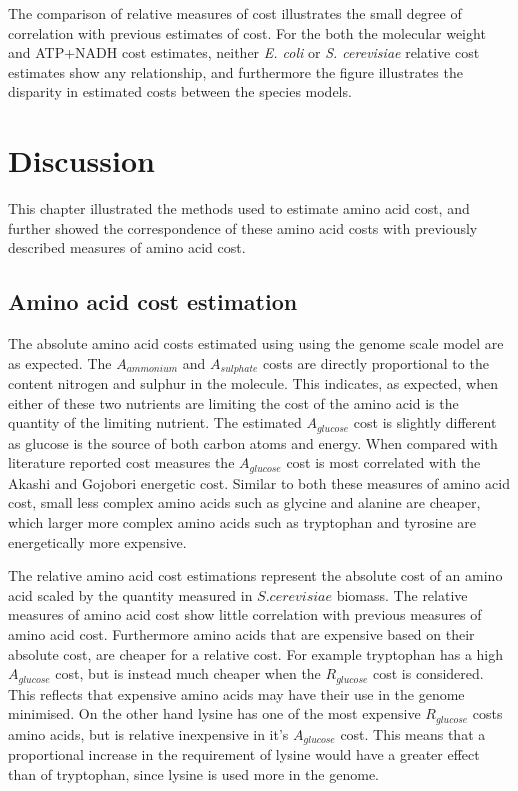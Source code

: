The comparison of relative measures of cost illustrates the small degree of correlation with previous estimates of cost. For the both the molecular weight and ATP+NADH cost estimates, neither \emph{E. coli} or \emph{S. cerevisiae} relative cost estimates show any relationship, and furthermore the figure illustrates the disparity in estimated costs between the species models.

\clearpage

\section{Discussion}

This chapter illustrated the methods used to estimate amino acid cost, and further showed the correspondence of these amino acid costs with previously described measures of amino acid cost.

\subsection{Amino acid cost estimation}

The absolute amino acid costs estimated using using the genome scale model are as expected. The $A_{ammonium}$ and $A_{sulphate}$ costs are directly proportional to the content nitrogen and sulphur in the molecule. This indicates, as expected, when either of these two nutrients are limiting the cost of the amino acid is the quantity of the limiting nutrient. The estimated $A_{glucose}$ cost is slightly different as glucose is the source of both carbon atoms and energy. When compared with literature reported cost measures the $A_{glucose}$ cost is most correlated with the Akashi and Gojobori energetic cost. Similar to both these measures of amino acid cost, small less complex amino acids such as glycine and alanine are cheaper, which larger more complex amino acids such as tryptophan and tyrosine are energetically more expensive.

The relative amino acid cost estimations represent the absolute cost of an amino acid scaled by the quantity measured in $S. cerevisiae$ biomass. The relative measures of amino acid cost show little correlation with previous measures of amino acid cost. Furthermore amino acids that are expensive based on their absolute cost, are cheaper for a relative cost. For example tryptophan has a high $A_{glucose}$ cost, but is instead much cheaper when the $R_{glucose}$ cost is considered. This reflects that expensive amino acids may have their use in the genome minimised. On the other hand lysine has one of the most expensive $R_{glucose}$ costs amino acids, but is relative inexpensive in it's $A_{glucose}$ cost. This means that a proportional increase in the requirement of lysine would have a greater effect than of tryptophan, since lysine is used more in the genome.

